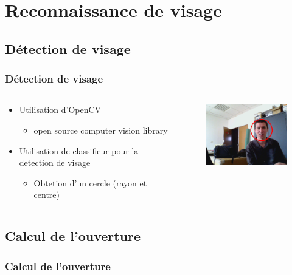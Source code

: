 \section{Reconnaissance de visage}
\subsection{Détection de visage}
\begin{frame}
  \frametitle{Détection de visage}
  \begin{columns}[c]
    \begin{column}[T]{.5\textwidth}
      \begin{itemize}
        \item Utilisation d'OpenCV
          \begin{itemize}
            \item open source computer vision library
          \end{itemize}
        \item Utilisation de classifieur pour la detection de visage
          \begin{itemize}
            \item Obtetion d'un cercle (rayon et centre)
          \end{itemize}
      \end{itemize}
    \end{column}
    \begin{column}[T]{.5\textwidth}
      \begin{figure}
        \begin{center}
          \includegraphics[width=5cm]{image/faceDetection.png}
        \end{center}
      \end{figure}
    \end{column}
  \end{columns}   
\end{frame}

\subsection{Calcul de l'ouverture}
\begin{frame}
  \frametitle{Calcul de l'ouverture}
  \begin{figure}
    \begin{columns}[c]
      \begin{column}[T]{.5\textwidth}
        
      \end{column}
      \begin{column}[T]{.5\textwidth}
        
      \end{column}
    \end{columns}   
  \end{figure}
\end{frame}

